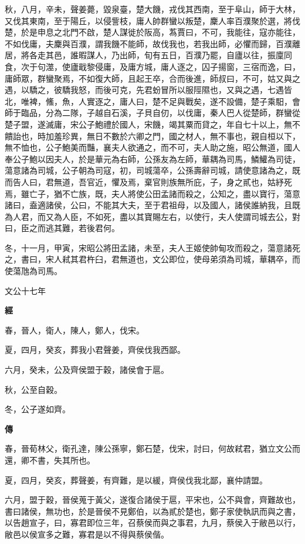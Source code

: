 \documentclass{ctexart}
\begin{document}
秋，八月，辛未，聲姜薨，毀泉臺，楚大饑，戎伐其西南，至于阜山，師于大林，又伐其東南，至于陽丘，以侵訾枝，庸人帥群蠻以叛楚，麇人率百濮聚於選，將伐楚，於是申息之北門不啟，楚人謀徙於阪高，蒍賈曰，不可，我能往，寇亦能往，不如伐庸，夫麇與百濮，謂我饑不能師，故伐我也，若我出師，必懼而歸，百濮離居，將各走其邑，誰暇謀人，乃出師，旬有五日，百濮乃罷，自廬以往，振廩同食，次于句澨，使廬戢黎侵庸，及庸方城，庸人逐之，囚子揚窗，三宿而逸，曰，庸師眾，群蠻聚焉，不如復大師，且起王卒，合而後進，師叔曰，不可，姑又與之遇，以驕之，彼驕我怒，而後可克，先君蚡冒所以服陘隰也，又與之遇，七遇皆北，唯裨，鯈，魚，人實逐之，庸人曰，楚不足與戰矣，遂不設備，楚子乘馹，會師于臨品，分為二隊，子越自石溪，子貝自仞，以伐庸，秦人巴人從楚師，群蠻從楚子盟，遂滅庸，宋公子鮑禮於國人，宋饑，竭其粟而貸之，年自七十以上，無不饋詒也，時加羞珍異，無日不數於六卿之門，國之材人，無不事也，親自桓以下，無不恤也，公子鮑美而豔，襄夫人欲通之，而不可，夫人助之施，昭公無道，國人奉公子鮑以因夫人，於是華元為右師，公孫友為左師，華耦為司馬，鱗鱹為司徒，蕩意諸為司城，公子朝為司寇，初，司城蕩卒，公孫壽辭司城，請使意諸為之，既而告人曰，君無道，吾官近，懼及焉，棄官則族無所庇，子，身之貳也，姑紓死焉，雖亡子，猶不亡族，既，夫人將使公田孟諸而殺之，公知之，盡以寶行，蕩意諸曰，盍適諸侯，公曰，不能其大夫，至于君祖母，以及國人，諸侯誰納我，且既為人君，而又為人臣，不如死，盡以其寶賜左右，以使行，夫人使謂司城去公，對曰，臣之而逃其難，若後君何。

冬，十一月，甲寅，宋昭公將田孟諸，未至，夫人王姬使帥甸攻而殺之，蕩意諸死之，書曰，宋人弒其君杵臼，君無道也，文公即位，使母弟須為司城，華耦卒，而使蕩虺為司馬。





文公十七年


\textbf{經}



春，晉人，衛人，陳人，鄭人，伐宋。

夏，四月，癸亥，葬我小君聲姜，齊侯伐我西鄙。

六月，癸未，公及齊侯盟于穀，諸侯會于扈。

秋，公至自穀。

冬，公子遂如齊。

\textbf{傳}



春，晉荀林父，衛孔達，陳公孫寧，鄭石楚，伐宋，討曰，何故弒君，猶立文公而還，卿不書，失其所也。

夏，四月，癸亥，葬聲姜，有齊難，是以緩，齊侯伐我北鄙，襄仲請盟。

六月，盟于穀，晉侯蒐于黃父，遂復合諸侯于扈，平宋也，公不與會，齊難故也，書曰諸侯，無功也，於是晉侯不見鄭伯，以為貳於楚也，鄭子家使執訊而與之書，以告趙宣子，曰，寡君即位三年，召蔡侯而與之事君，九月，蔡侯入于敝邑以行，敝邑以侯宣多之難，寡君是以不得與蔡侯偕。
\end{document}
